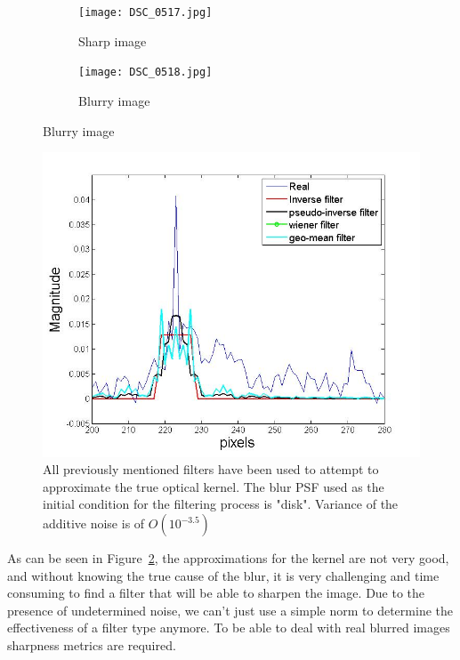 \begin{figure}
        \centering
        \begin{subfigure}[b]{0.4\textwidth}
                \centering
                \texttt{[image: DSC\_0517.jpg]}
                \caption{Sharp image}
                
        \end{subfigure}
        \begin{subfigure}[b]{0.4\textwidth}
                \centering
                \texttt{[image: DSC\_0518.jpg]}
                \caption{Blurry image} 
        \end{subfigure}
 \label{fig:barrels}
\end{figure}

\begin{figure}[h!]

  \centering
                \centering
                \includegraphics[width=.5\textwidth]{true_kernel.jpg}
                \caption{All previously mentioned filters have been used to attempt to approximate the true optical kernel. The blur PSF used as the initial condition for the filtering process is "disk". Variance of the additive noise is of $O(10^{-3.5})$ }
                \label{fig:true_kernel}
\end{figure}
\newpage  
As can be seen in Figure~\ref{fig:true_kernel}, the approximations for the kernel are not very good, and without knowing the true cause of the blur, it is very challenging and time consuming to find a filter that will be able to sharpen the image. Due to the presence of undetermined noise, we can't just use a simple norm to determine the effectiveness of a filter type anymore. To be able to deal with real blurred images sharpness metrics are required.